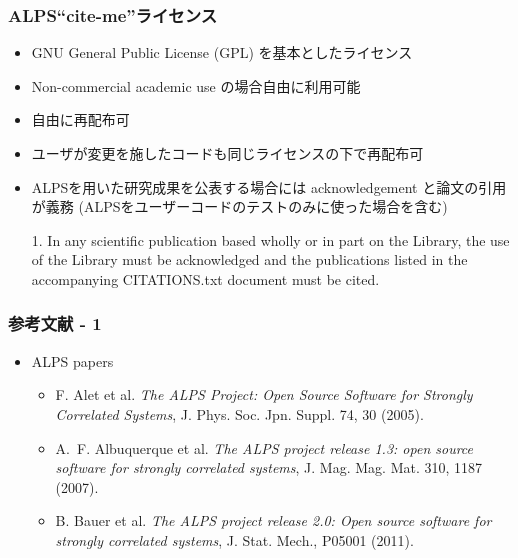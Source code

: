 \begin{frame}
\frametitle{ALPS``cite-me''ライセンス}
  \begin{itemize}
  \item GNU General Public License (GPL) を基本としたライセンス
  \item Non-commercial academic use の場合自由に利用可能
  \item 自由に再配布可
  \item ユーザが変更を施したコードも同じライセンスの下で再配布可
  \item ALPSを用いた研究成果を公表する場合には acknowledgement と論文の引用が義務 (ALPSをユーザーコードのテストのみに使った場合を含む)
    \begin{minipage}{.9\textwidth}
    \begin{block}{}
      1. In any scientific publication based wholly or in part on the
      Library, the use of the Library must be acknowledged and the
      publications listed in the accompanying CITATIONS.txt document
      must be cited.
    \end{block}
    \end{minipage}
  \end{itemize}
\end{frame}

\begin{frame}
  \frametitle{参考文献 - 1}
  \begin{itemize}
  \item ALPS papers
    \begin{itemize}
    \item F. Alet et al. {\it The ALPS Project: Open Source Software for
      Strongly Correlated Systems}, J. Phys. Soc. Jpn. Suppl. 74, 30
      (2005).
    \item A.~F. Albuquerque et al. {\it The ALPS project release 1.3: open source software for strongly correlated systems}, J. Mag. Mag. Mat. 310, 1187 (2007).
    \item B. Bauer et al. {\it The ALPS project release 2.0: Open source software for strongly correlated systems}, J. Stat. Mech., P05001 (2011).
    \end{itemize}
  \end{itemize}
\end{frame}

